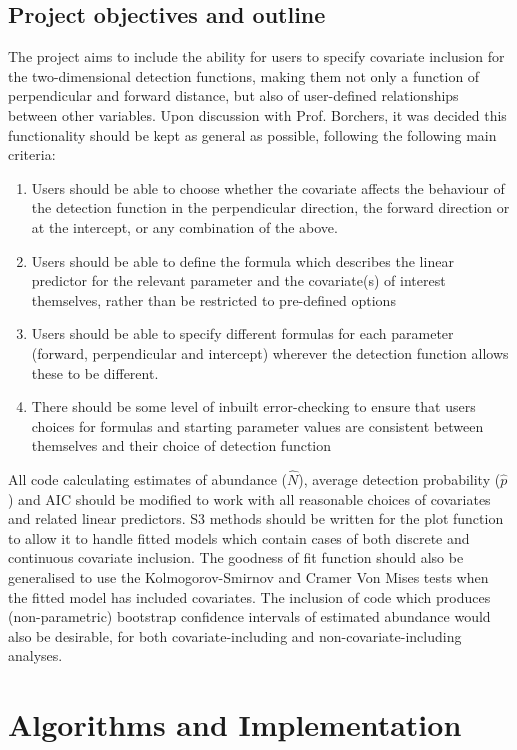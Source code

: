\documentclass[11pt]{article}
\begin{document}
\begin{multicols}{2}
\subsection{Project objectives and outline}
The project aims to include the ability for users to specify covariate inclusion for the two-dimensional detection functions, making them not only a function of perpendicular and forward distance, but also of user-defined relationships between other variables. Upon discussion with Prof. Borchers, it was decided this functionality should be kept as general as possible, following the following main criteria:

\begin{enumerate}
\item Users should be able to choose whether the covariate affects the behaviour of the detection function in the perpendicular direction, the forward direction or at the intercept, or any combination of the above.
\item Users should be able to define the formula which describes the linear predictor for the relevant parameter and the covariate(s) of interest themselves, rather than be restricted to pre-defined options
\item Users should be able to specify different formulas for each parameter (forward, perpendicular and intercept) wherever the detection function allows these to be different.
\item There should be some level of inbuilt error-checking to ensure that users choices for formulas and starting parameter values are consistent between themselves and their choice of detection function
\end{enumerate}

All code calculating estimates of abundance ($\hat{N}$), average detection probability ($\hat{p}$) and AIC should be modified to work with all reasonable choices of covariates and related linear predictors. S3 methods should be written for the plot function to allow it to handle fitted models which contain cases of both discrete and continuous covariate inclusion. The goodness of fit function should also be generalised to use the Kolmogorov-Smirnov and Cramer Von Mises tests when the fitted model has included covariates. The inclusion of code which produces (non-parametric) bootstrap confidence intervals of estimated abundance would also be desirable, for both covariate-including and non-covariate-including analyses.

\section{Algorithms and Implementation}

\end{multicols}
\end{document}
